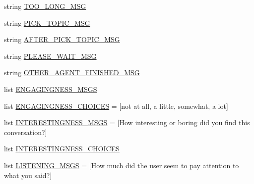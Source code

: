 \begin{DoxyCompactItemize}
\item 
string \hyperlink{namespaceprojects_1_1controllable__dialogue_1_1mturk_1_1worlds_a08577485aa774348a388207ed55523ea}{T\+O\+O\+\_\+\+L\+O\+N\+G\+\_\+\+M\+SG}
\item 
string \hyperlink{namespaceprojects_1_1controllable__dialogue_1_1mturk_1_1worlds_ad771d29aad1dc9d7cb142c7b66163a23}{P\+I\+C\+K\+\_\+\+T\+O\+P\+I\+C\+\_\+\+M\+SG}
\item 
string \hyperlink{namespaceprojects_1_1controllable__dialogue_1_1mturk_1_1worlds_a5810bc904ad20fa19c87898c74ee3ac1}{A\+F\+T\+E\+R\+\_\+\+P\+I\+C\+K\+\_\+\+T\+O\+P\+I\+C\+\_\+\+M\+SG}
\item 
string \hyperlink{namespaceprojects_1_1controllable__dialogue_1_1mturk_1_1worlds_a590a5ee06bd1bc77779d856867e7d9f7}{P\+L\+E\+A\+S\+E\+\_\+\+W\+A\+I\+T\+\_\+\+M\+SG}
\item 
string \hyperlink{namespaceprojects_1_1controllable__dialogue_1_1mturk_1_1worlds_a006c66711064ef1d555dc887cabb4814}{O\+T\+H\+E\+R\+\_\+\+A\+G\+E\+N\+T\+\_\+\+F\+I\+N\+I\+S\+H\+E\+D\+\_\+\+M\+SG}
\item 
list \hyperlink{namespaceprojects_1_1controllable__dialogue_1_1mturk_1_1worlds_a419bbbd453c1d385cceb759273baf44f}{E\+N\+G\+A\+G\+I\+N\+G\+N\+E\+S\+S\+\_\+\+M\+S\+GS}
\item 
list \hyperlink{namespaceprojects_1_1controllable__dialogue_1_1mturk_1_1worlds_a780260cc80b49b2929c8c829f2fc9bdf}{E\+N\+G\+A\+G\+I\+N\+G\+N\+E\+S\+S\+\_\+\+C\+H\+O\+I\+C\+ES} = \mbox{[}\textquotesingle{}not at all\textquotesingle{}, \textquotesingle{}a little\textquotesingle{}, \textquotesingle{}somewhat\textquotesingle{}, \textquotesingle{}a lot\textquotesingle{}\mbox{]}
\item 
list \hyperlink{namespaceprojects_1_1controllable__dialogue_1_1mturk_1_1worlds_aecdf59ec33e7d8a62f1687a0efeb844f}{I\+N\+T\+E\+R\+E\+S\+T\+I\+N\+G\+N\+E\+S\+S\+\_\+\+M\+S\+GS} = \mbox{[}\textquotesingle{}How interesting or boring did you find this conversation?\textquotesingle{}\mbox{]}
\item 
list \hyperlink{namespaceprojects_1_1controllable__dialogue_1_1mturk_1_1worlds_aef5b64528f618fb7c6b08e9ccfda85f4}{I\+N\+T\+E\+R\+E\+S\+T\+I\+N\+G\+N\+E\+S\+S\+\_\+\+C\+H\+O\+I\+C\+ES}
\item 
list \hyperlink{namespaceprojects_1_1controllable__dialogue_1_1mturk_1_1worlds_abd85dd4cf8dd2172388556c529cbaed1}{L\+I\+S\+T\+E\+N\+I\+N\+G\+\_\+\+M\+S\+GS} = \mbox{[}\textquotesingle{}How much did the user seem to pay attention to what you said?\textquotesingle{}\mbox{]}

\end{DoxyCompactItemize}
